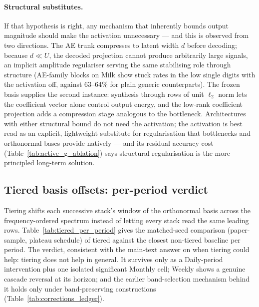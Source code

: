 \paragraph{Structural substitutes.} If that hypothesis is right, any
mechanism that inherently bounds output magnitude should make the
activation unnecessary --- and this is observed from two directions.
The AE trunk compresses to latent width $d$ before decoding; because
$d \ll U$, the decoded projection cannot produce arbitrarily large signals,
an implicit amplitude regulariser serving the same stabilising role through
structure (AE-family blocks on Milk show stuck rates in the low single
digits with the activation off, against 63--64\% for plain generic
counterparts). The frozen basis supplies the second instance: synthesis
through rows of unit $\ell_2$ norm lets the coefficient vector alone
control output energy, and the low-rank coefficient projection adds a
compression stage analogous to the bottleneck. Architectures with either
structural bound do not need the activation; the activation is best read as
an explicit, lightweight substitute for regularisation that bottlenecks and
orthonormal bases provide natively --- and its residual accuracy cost
(Table~\ref{tab:active_g_ablation}) says structural regularisation is the
more principled long-term solution.

\subsection{Tiered basis offsets: per-period verdict}
\label{app:ablations:tiered}

Tiering shifts each successive stack's window of the orthonormal basis
across the frequency-ordered spectrum instead of letting every stack read
the same leading rows. Table~\ref{tab:tiered_per_period} gives the
matched-seed comparison (paper-sample, plateau schedule) of tiered against
the closest non-tiered baseline per period. The verdict, consistent with
the main-text answer on when tiering could help: tiering does not help in
general. It survives only as a Daily-period intervention plus one isolated
significant Monthly cell; Weekly shows a genuine cascade reversal at its
horizon; and the earlier band-selection mechanism behind it holds only
under band-preserving constructions
(Table~\ref{tab:corrections_ledger}).

